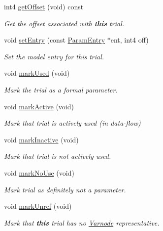 \begin{DoxyCompactItemize}
int4 \mbox{\hyperlink{class_param_trial_a7f3302664c5c80a9d9f6ca3ce4ae38d7}{get\+Offset}} (void) const
\begin{DoxyCompactList}\small\item\em Get the offset associated with {\bfseries{this}} trial. \end{DoxyCompactList}\item 
void \mbox{\hyperlink{class_param_trial_aed34fdf0eec82c9a56fc7ff105bad618}{set\+Entry}} (const \mbox{\hyperlink{class_param_entry}{Param\+Entry}} $\ast$ent, int4 off)
\begin{DoxyCompactList}\small\item\em Set the model entry for this trial. \end{DoxyCompactList}\item 
void \mbox{\hyperlink{class_param_trial_aa4ffa0c04adb864a3cfcff61f5b75051}{mark\+Used}} (void)
\begin{DoxyCompactList}\small\item\em Mark the trial as a formal parameter. \end{DoxyCompactList}\item 
void \mbox{\hyperlink{class_param_trial_aa929e7464a8b48843ba7e03f7a741e0a}{mark\+Active}} (void)
\begin{DoxyCompactList}\small\item\em Mark that trial is actively used (in data-\/flow) \end{DoxyCompactList}\item 
void \mbox{\hyperlink{class_param_trial_a2739d29f090bc6f5751dd10aa6cc9a65}{mark\+Inactive}} (void)
\begin{DoxyCompactList}\small\item\em Mark that trial is not actively used. \end{DoxyCompactList}\item 
void \mbox{\hyperlink{class_param_trial_a7006ab058b4af10027cc87ee1b81b476}{mark\+No\+Use}} (void)
\begin{DoxyCompactList}\small\item\em Mark trial as definitely {\itshape not} a parameter. \end{DoxyCompactList}\item 
void \mbox{\hyperlink{class_param_trial_a7ede623de85ba60fc1b3e463de10b0fc}{mark\+Unref}} (void)
\begin{DoxyCompactList}\small\item\em Mark that {\bfseries{this}} trial has no \mbox{\hyperlink{class_varnode}{Varnode}} representative. \end{DoxyCompactList}\item 

\end{DoxyCompactItemize}

